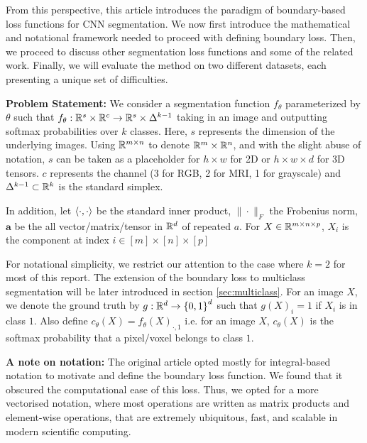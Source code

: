 \documentclass[onecolumn]{article}
\begin{document}
From this perspective, this article introduces the paradigm of boundary-based loss functions for CNN segmentation. We now first introduce the mathematical and notational framework needed to proceed with defining boundary loss. Then, we proceed to discuss other segmentation loss functions and some of the related work. Finally, we will evaluate the method on two different datasets, each presenting a unique set of difficulties. 


\textbf{Problem Statement:} We consider a  segmentation function $f_\theta$ parameterized by $\theta$ such that  $f_\theta: \mathbb{R}^s \times \mathbb{R}^c \rightarrow \mathbb{R}^s \times \Delta^{k-1}$ taking in an image and outputting softmax probabilities over $k$ classes. Here, $s$ represents the dimension of the underlying images. Using $\mathbb{R}^{m\times n}$ to denote $\mathbb{R}^m \times \mathbb{R}^n$, and with the slight abuse of notation, $s$ can be taken as a placeholder for $h\times w$ for 2D or $h\times w\times d$ for 3D tensors.  $c$ represents the channel (3 for RGB, 2 for MRI, 1 for grayscale) and $\Delta^{k-1}\subset \mathbb{R}^k$ is the standard simplex.

In addition, let $\left \langle \cdot, \cdot \right \rangle$ be the standard inner product, $\|\cdot\|_F$ the Frobenius norm, $\bm{a}$ be the all vector/matrix/tensor in $\mathbb{R}^d$ of repeated $a$. For $X\in \mathbb{R}^{m\times n\times p}$, $X_i$ is the component at index $i \in [m]\times [n] \times [p]$


For notational simplicity, we restrict our attention to the case where $k=2$ for most of this report. The extension of the boundary loss to multiclass segmentation will be later introduced in section \ref{sec:multiclass}. For an image $X$, we denote the ground truth by  $g:\mathbb{R}^d \rightarrow \left \{ 0,1 \right \}^d$ such that $g(X)_i=1$ if $X_i$ is in class $1$. Also define $c_\theta(X) = f_\theta(X)_{\cdot, 1}$ i.e. for an image $X$, $c_\theta(X)$ is the softmax probability that a pixel/voxel belongs to class $1$. 

\textbf{A note on notation:} The original article opted mostly for integral-based notation to motivate and define the boundary loss function. We found that it obscured the computational ease of this loss. Thus, we opted for a more vectorised notation, where most operations are written as matrix products and element-wise operations, that are extremely ubiquitous, fast, and scalable in modern scientific computing. 
\end{document}
